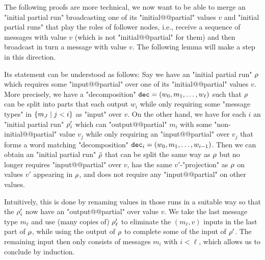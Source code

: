The following proofs are more technical, we now want to be able to merge an "initial partial run" broadcasting one of its "initial@@partial" values $v$ and "initial partial runs" that play the roles of follower nodes, i.e., receive a sequence of messages with value $v$ (which is not "initial@@partial" for them) and then broadcast in turn a message with value $v$. The following lemma will make a step in this direction.

Its statement can be understood as follows: Say we have an "initial partial run" $\rho$ which requires some "input@@partial" over one of its "initial@@partial" values $v$. More precisely, we have a "decomposition" $\mathtt{dec} = (w_0, m_1, \ldots, w_\ell)$ such that $\rho$ can be split into parts that each output $w_i$ while only requiring some "message types" in $\{m_J \mid j<i \}$ as "input" over $v$. On the other hand, we have for each $i$ an "initial partial run" $\rho'_i$ which can "output@@partial" $m_i$ with some "non-initial@@partial" value $v_j$ while only requiring an "input@@partial" over $v_j$ that forms a word matching "decomposition" $\mathtt{dec}_i = (w_0, m_1, \ldots, w_{i-1})$. 
Then we can obtain  an "initial partial run" $\Tilde{\rho}$ that can be split the same way as $\rho$ but no longer requires "input@@partial" over $v$, has the same $v'$-"projection" as $\rho$ on values $v'$ appearing in $\rho$, and does not require any "input@@partial" on other values.

Intuitively, this is done by renaming values in those runs in a suitable way so that the $\rho'_i$ now have an "output@@partial" over value $v$. We take the last message type $m_\ell$ and use (many copies of) $\rho'_\ell$ to eliminate the $(m_\ell, v)$ inputs in the last part of $\rho$, while using the output of $\rho$ to complete some of the input of $\rho'$. 
The remaining input then only consists of messages $m_{i}$ with $i<\ell$, which allows us to conclude by induction.

